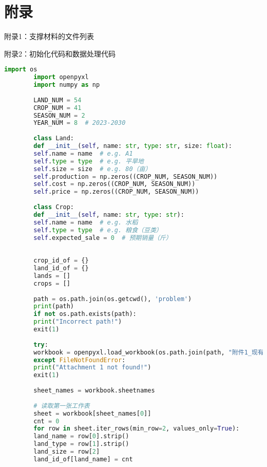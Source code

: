 \documentclass[a4paper]{article}
\begin{document}
	
	\newpage
	\section*{附录}
	
	附录1：支撑材料的文件列表
	
	
	附录2：初始化代码和数据处理代码
	\begin{lstlisting}[language=python,columns=fullflexible,frame=shadowbox]
		import os
		import openpyxl
		import numpy as np
		
		LAND_NUM = 54
		CROP_NUM = 41
		SEASON_NUM = 2
		YEAR_NUM = 8  # 2023-2030
		
		class Land:
		def __init__(self, name: str, type: str, size: float):
		self.name = name  # e.g. A1
		self.type = type  # e.g. 平旱地
		self.size = size  # e.g. 80（亩）
		self.production = np.zeros((CROP_NUM, SEASON_NUM))
		self.cost = np.zeros((CROP_NUM, SEASON_NUM))
		self.price = np.zeros((CROP_NUM, SEASON_NUM))
		
		class Crop:
		def __init__(self, name: str, type: str):
		self.name = name  # e.g. 水稻
		self.type = type  # e.g. 粮食（豆类）
		self.expected_sale = 0  # 预期销量（斤）
		
		
		crop_id_of = {}
		land_id_of = {}
		lands = []
		crops = []
		
		path = os.path.join(os.getcwd(), 'problem')
		print(path)
		if not os.path.exists(path):
		print("Incorrect path!")
		exit(1)
		
		try:
		workbook = openpyxl.load_workbook(os.path.join(path, "附件1_现有作物与土地情况.xlsx"))
		except FileNotFoundError:
		print("Attachment 1 not found!")
		exit(1)
		
		sheet_names = workbook.sheetnames
		
		# 读取第一张工作表
		sheet = workbook[sheet_names[0]]
		cnt = 0
		for row in sheet.iter_rows(min_row=2, values_only=True):
		land_name = row[0].strip()
		land_type = row[1].strip()
		land_size = row[2]
		land_id_of[land_name] = cnt
		

\end{lstlisting}
\end{document}
